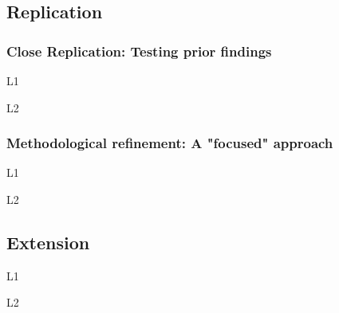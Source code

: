 \subsection{Replication}

\subsubsection{Close Replication: Testing prior findings}

L1 

L2

\subsubsection{Methodological refinement: A "focused" approach}

L1 

L2

\subsection{Extension}

L1 

L2


